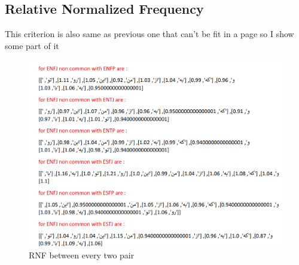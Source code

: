 \documentclass[10pt, a4paper]{article}
\begin{document}
\subsection{Relative Normalized Frequency}
This criterion is also same as previous one that can't be fit in a page so I show some part of it
\begin{figure}[H]
    \centering
    \includegraphics[width=0.7\linewidth]{../stats/RNF.png}
    \caption{RNF between every two pair}
\end{figure}
\newpage
\end{document}
